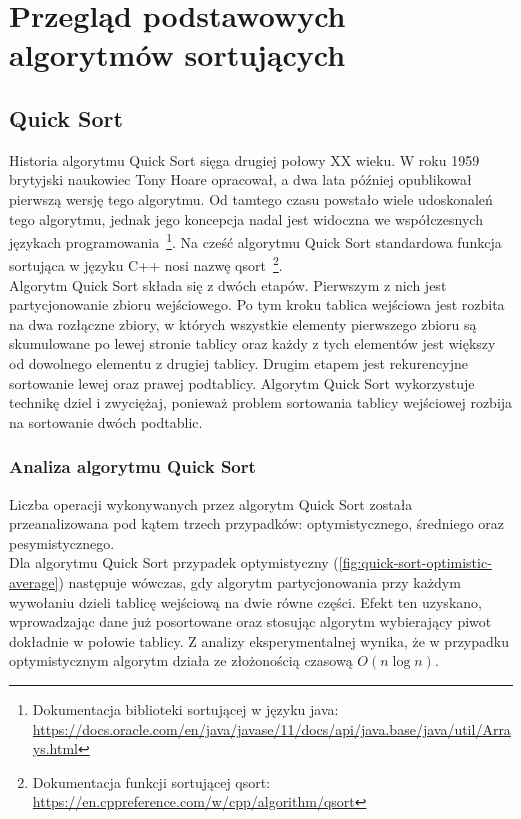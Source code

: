 \chapter{Przegląd podstawowych algorytmów sortujących}
\thispagestyle{chapterBeginStyle}


\section{Quick Sort}


Historia algorytmu Quick Sort sięga drugiej połowy XX wieku. W roku 1959 brytyjski naukowiec Tony Hoare
opracował, a dwa lata później opublikował pierwszą wersję tego algorytmu. Od tamtego czasu powstało wiele
udoskonaleń tego algorytmu, jednak jego koncepcja nadal jest widoczna we współczesnych językach programowania
\,\footnote{Dokumentacja biblioteki sortującej w języku java: \url{https://docs.oracle.com/en/java/javase/11/docs/api/java.base/java/util/Arrays.html}}.
Na cześć algorytmu Quick Sort standardowa funkcja sortująca w języku C++ nosi nazwę qsort
\,\footnote{Dokumentacja funkcji sortującej qsort:
\url{https://en.cppreference.com/w/cpp/algorithm/qsort}}.\\

Algorytm Quick Sort składa się z dwóch etapów. Pierwszym z nich jest partycjonowanie zbioru wejściowego.
Po tym kroku tablica wejściowa jest rozbita na dwa rozłączne zbiory, w których wszystkie elementy pierwszego
zbioru są skumulowane po lewej stronie tablicy oraz każdy z tych elementów jest większy od dowolnego elementu
z drugiej tablicy. Drugim etapem jest rekurencyjne sortowanie lewej oraz prawej podtablicy.
Algorytm Quick Sort wykorzystuje technikę dziel i zwyciężaj, ponieważ problem sortowania tablicy wejściowej
rozbija na sortowanie dwóch podtablic.


\subsection{Analiza algorytmu Quick Sort}

Liczba operacji wykonywanych przez algorytm Quick Sort została przeanalizowana pod kątem trzech przypadków:
optymistycznego, średniego oraz pesymistycznego.\\

Dla algorytmu Quick Sort przypadek optymistyczny (\ref{fig:quick-sort-optimistic-average}) następuje wówczas, gdy algorytm partycjonowania przy każdym wywołaniu dzieli tablicę wejściową na dwie równe części. Efekt ten uzyskano, wprowadzając dane już posortowane oraz stosując algorytm wybierający piwot dokładnie w połowie tablicy. Z analizy eksperymentalnej wynika, że w przypadku optymistycznym algorytm działa ze złożonością czasową $O(n\log{}n)$.\\

